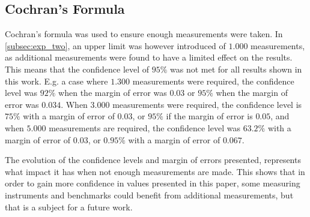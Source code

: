 \subsection{Cochran's Formula}

Cochran's formula was used to ensure enough measurements were taken. In \cref{subsec:exp_two}, an upper limit was however introduced of $1.000$ measurements, as additional measurements were found to have a limited effect on the results. This means that the confidence level of $95\%$ was not met for all results shown in this work. E.g. a case where $1.300$ measurements were required, the confidence level was $92\%$ when the margin of error was $0.03$ or $95\%$ when the margin of error was $0.034$. When $3.000$ measurements were required, the confidence level is $75\%$ with a margin of error of $0.03$, or $95\%$ if the margin of error is $0.05$, and when $5.000$ measurements are required, the confidence level was $63.2\%$ with a margin of error of $0.03$, or $0.95\%$ with a margin of error of $0.067$.

The evolution of the confidence levels and margin of errors presented, represents what impact it has when not enough measurements are made. This shows that in order to gain more confidence in values presented in this paper, some measuring instruments and benchmarks could benefit from additional measurements, but that is a subject for a future work.